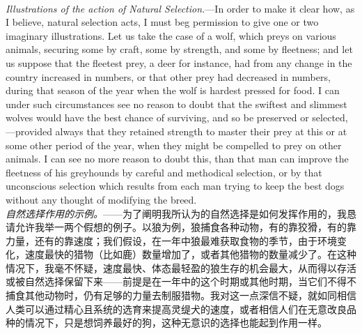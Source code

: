 \documentclass{article}
\begin{document}
\\
\textit{Illustrations of the action of Natural Selection.}—In order to make it clear how, as I believe, natural selection acts, I must beg permission to give one or two imaginary illustrations. Let us take the case of a wolf, which preys on various animals, securing some by craft, some by strength, and some by fleetness; and let us suppose that the fleetest prey, a deer for instance, had from any change in the country increased in numbers, or that other prey had decreased in numbers, during that season of the year when the wolf is hardest pressed for food. I can under such circumstances see no reason to doubt that the swiftest and slimmest wolves would have the best chance of surviving, and so be preserved or selected,—provided always that they retained strength to master their prey at this or at some other period of the year, when they might be compelled to prey on other animals. I can see no more reason to doubt this, than that man can improve the fleetness of his greyhounds by careful and methodical selection, or by that unconscious selection which results from each man trying to keep the best dogs without any thought of modifying the breed.\\
\textit{自然选择作用的示例。}——为了阐明我所认为的自然选择是如何发挥作用的，我恳请允许我举一两个假想的例子。以狼为例，狼捕食各种动物，有的靠狡猾，有的靠力量，还有的靠速度；我们假设，在一年中狼最难获取食物的季节，由于环境变化，速度最快的猎物（比如鹿）数量增加了，或者其他猎物的数量减少了。在这种情况下，我毫不怀疑，速度最快、体态最轻盈的狼生存的机会最大，从而得以存活或被自然选择保留下来——前提是在一年中的这个时期或其他时期，当它们不得不捕食其他动物时，仍有足够的力量去制服猎物。我对这一点深信不疑，就如同相信人类可以通过精心且系统的选育来提高灵缇犬的速度，或者相信人们在无意改良品种的情况下，只是想饲养最好的狗，这种无意识的选择也能起到作用一样。\\
\end{document}
